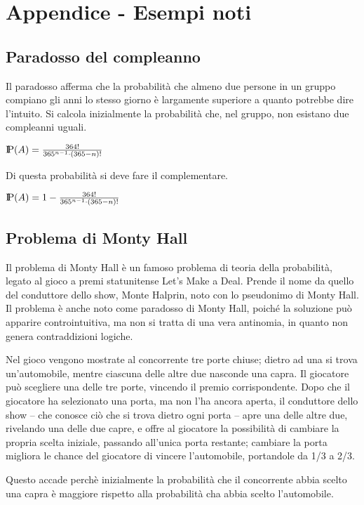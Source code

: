 \chapter{Appendice - Esempi noti}

\section{Paradosso del compleanno}

Il paradosso afferma che la probabilità che almeno due persone in un gruppo compiano gli anni lo stesso giorno è largamente superiore a quanto potrebbe dire l'intuito. Si calcola inizialmente la probabilità che, nel gruppo, non esistano due compleanni uguali.

\begin{center}
    $\text{I\kern-0.2 em P}(A) = \frac{364!}{365^{n-1} \cdot (365 - n)!}$
\end{center}

Di questa probabilità si deve fare il complementare.

\begin{center}
    $\text{I\kern-0.2 em P}(A) = 1 - \frac{364!}{365^{n-1} \cdot (365 - n)!}$
\end{center}
 
\section{Problema di Monty Hall}

 Il problema di Monty Hall è un famoso problema di teoria della probabilità, legato al gioco a premi statunitense Let's Make a Deal. Prende il nome da quello del conduttore dello show, Monte Halprin, noto con lo pseudonimo di Monty Hall. Il problema è anche noto come paradosso di Monty Hall, poiché la soluzione può apparire controintuitiva, ma non si tratta di una vera antinomia, in quanto non genera contraddizioni logiche.

 Nel gioco vengono mostrate al concorrente tre porte chiuse; dietro ad una si trova un'automobile, mentre ciascuna delle altre due nasconde una capra. Il giocatore può scegliere una delle tre porte, vincendo il premio corrispondente. Dopo che il giocatore ha selezionato una porta, ma non l'ha ancora aperta, il conduttore dello show – che conosce ciò che si trova dietro ogni porta – apre una delle altre due, rivelando una delle due capre, e offre al giocatore la possibilità di cambiare la propria scelta iniziale, passando all'unica porta restante; cambiare la porta migliora le chance del giocatore di vincere l'automobile, portandole da 1/3 a 2/3.

 Questo accade perchè inizialmente la probabilità che il concorrente abbia scelto una capra è maggiore rispetto alla probabilità cha abbia scelto l'automobile.